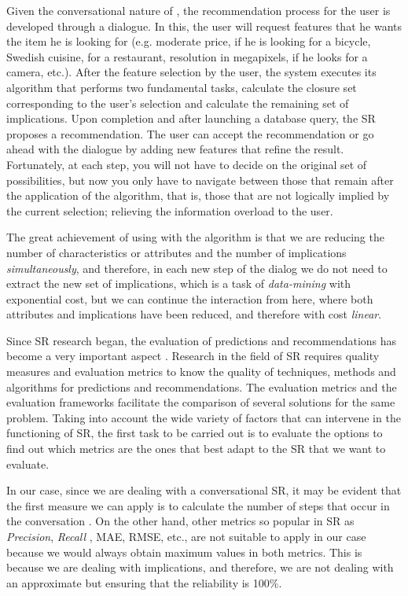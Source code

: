 Given the conversational nature of \rs, the recommendation process for the user is developed through a dialogue. In this, the user will request features that he wants the item he is looking for (e.g. moderate price, if he is looking for a bicycle, Swedish cuisine, for a restaurant, resolution in megapixels, if he looks for a camera, etc.). After the feature selection by the user, the system executes its algorithm that performs two fundamental tasks, calculate the closure set corresponding to the user's selection and calculate the remaining set of implications. Upon completion and after launching a database query, the SR proposes a recommendation. The user can accept the recommendation or go ahead with the dialogue by adding new features that refine the result. Fortunately, at each step, you will not have to decide on the original set of possibilities, but now you only have to navigate between those that remain after the application of the algorithm, that is, those that are not logically implied by the current selection; relieving the information overload to the user.


The great achievement of using \rse with the algorithm \cierree is that we are reducing the number of characteristics or attributes and the number of implications \textit{simultaneously}, and therefore, in each new step of the dialog we do not need to extract the new set of implications, which is a task of \textit{data-mining} with exponential cost, but we can continue the interaction from here, where both attributes and implications have been reduced, and therefore with cost \textit{linear}.

Since SR research began, the evaluation of predictions and recommendations has become a very important aspect \cite{Herlocker2004, Burke2010}. Research in the field of SR requires quality measures and evaluation metrics \cite{Gunawardana2009} to know the quality of techniques, methods and algorithms for predictions and recommendations. The evaluation metrics \cite{HernandezdelOlmo2008} and the evaluation frameworks \cite{Bobadilla2011} facilitate the comparison of several solutions for the same problem. Taking into account the wide variety of factors that can intervene in the functioning of SR, the first task to be carried out is to evaluate the options to find out which metrics are the ones that best adapt to the SR that we want to evaluate.

In our case, since we are dealing with a conversational SR, it may be evident that the first measure we can apply is to calculate the number of steps that occur in the conversation \cite{McSherry01}. On the other hand, other metrics so popular in SR as \textit{Precision}, \textit{Recall} \cite{Gunawardana2015}, MAE, RMSE, etc., are not suitable to apply in our case because we would always obtain maximum values in both metrics. This is because we are dealing with implications, and therefore, we are not dealing with an approximate but ensuring that the reliability is 100\%.

